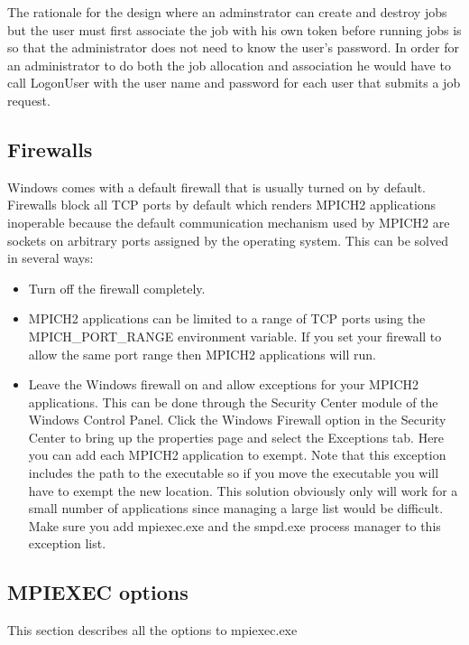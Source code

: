 \documentclass[dvipdfm,11pt]{article}
\begin{document}
The rationale for the design where an adminstrator can create and destroy jobs but the user must first associate
the job with his own token before running jobs is so that the administrator does not need to know the user's
password.  In order for an administrator to do both the job allocation and association he would have to call
LogonUser with the user name and password for each user that submits a job request.

\subsection{Firewalls}
Windows comes with a default firewall that is usually turned on by default.
Firewalls block all TCP ports by default which renders MPICH2 applications inoperable
because the default communication mechanism used by MPICH2 are sockets on arbitrary
ports assigned by the operating system.  This can be solved in several ways:

\begin{itemize}
\item Turn off the firewall completely.
\item  MPICH2 applications can be limited to a range of TCP ports using the 
MPICH\_PORT\_RANGE environment variable.  If you set your firewall to allow the
same port range then MPICH2 applications will run.
\item Leave the Windows firewall on and allow exceptions for your MPICH2 applications.
This can be done through the Security Center module of the Windows Control 
Panel.  Click the Windows Firewall option in the Security Center to bring up
the properties page and select the Exceptions tab.  Here you can add each 
MPICH2 application to exempt.  Note that this exception includes the path to
the executable so if you move the executable you will have to exempt the new
location.  This solution obviously only will work for a small number of 
applications since managing a large list would be difficult.  Make sure you add
mpiexec.exe and the smpd.exe process manager to this exception list.
\end{itemize}

\subsection{MPIEXEC options}
This section describes all the options to mpiexec.exe
\end{document}
